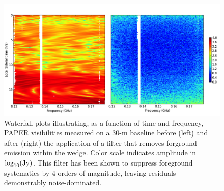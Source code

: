 \documentclass[preprint]{aastex}
\begin{document}
\begin{figure}[t]\centering
\includegraphics[width=6in]{plots/waterfall_filtered.png}
\caption{\small 
Waterfall plots illustrating, as a function of time and frequency, PAPER visibilities
measured on a 30-m baseline before (left) and after (right) the application of a 
filter that removes forground emission within the wedge.  Color scale indicates amplitude in $\log_{10}({\rm Jy})$.
This filter has been shown to suppress
foreground systematics by 4 orders of magnitude, leaving residuals demonstrably noise-dominated.
}\label{fig:waterfall} \end{figure}
\end{document}
